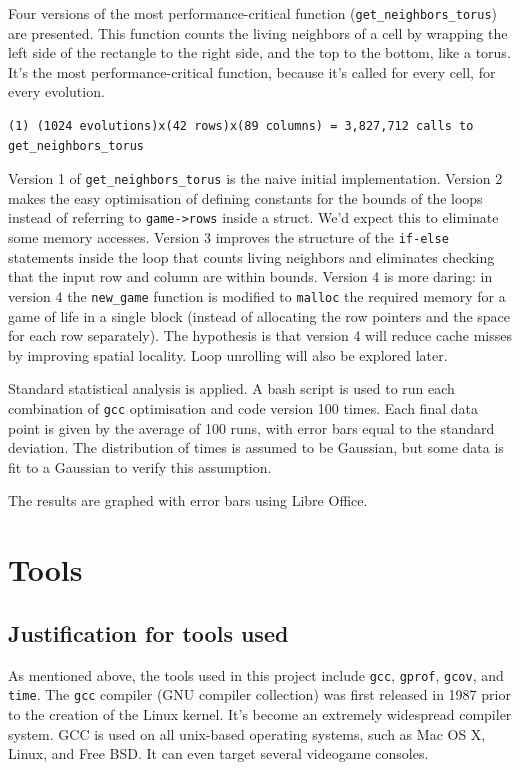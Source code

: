 \documentclass{article}
\begin{document}
Four versions of the most performance-critical function (\verb=get_neighbors_torus=) are presented. This function counts the living neighbors of a cell by wrapping the left side of the rectangle to the right side, and the top to the bottom, like a torus. It's the most performance-critical function, because it's called for every cell, for every evolution.

\label{eqn1}
\begin{verbatim}
(1) (1024 evolutions)x(42 rows)x(89 columns) = 3,827,712 calls to get_neighbors_torus
\end{verbatim}

 Version 1 of \verb=get_neighbors_torus= is the naive initial implementation. Version 2 makes the easy optimisation of defining constants for the bounds of the loops instead of referring to \verb=game->rows= inside a struct. We'd expect this to eliminate some memory accesses. Version 3 improves the structure of the \verb=if-else= statements inside the loop that counts living neighbors and eliminates checking that the input row and column are within bounds. Version 4 is more daring: in version 4 the \verb=new_game= function is modified to \verb=malloc= the required memory for a game of life in a single block (instead of allocating the row pointers and the space for each row separately). The hypothesis is that version 4 will reduce cache misses by improving spatial locality. Loop unrolling will also be explored later.  

Standard statistical analysis is applied. A bash script is used to run each combination of \verb=gcc= optimisation and code version 100 times. Each final data point is given by the average of 100 runs, with error bars equal to the standard deviation. The distribution of times is assumed to be Gaussian, but some data is fit to a Gaussian to verify this assumption. 

The results are graphed with error bars using Libre Office. 

\section{Tools}
\subsection{Justification for tools used}
As mentioned above, the tools used in this project include \verb=gcc=, \verb=gprof=, 
\verb=gcov=, and \verb=time=. The \verb=gcc= compiler (GNU compiler collection) was 
first released in 1987 prior to the creation of the Linux kernel. It's become an extremely widespread compiler system. GCC is used on all unix-based operating systems, such as Mac OS X, Linux, and Free BSD. It can even target several videogame consoles.  
\end{document}
